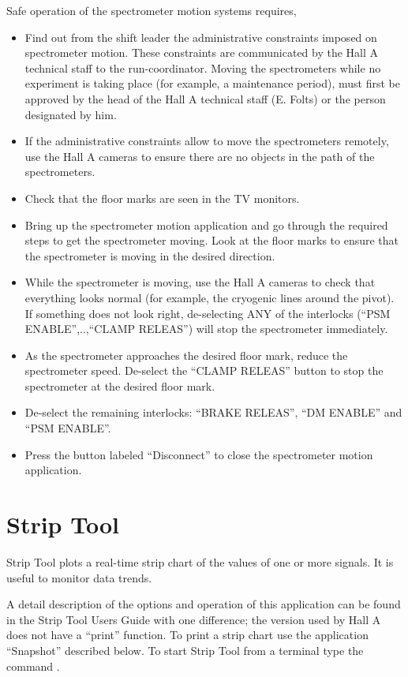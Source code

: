 {\begin{safetyen}{30}{10}
Safe operation of the spectrometer motion systems requires,
\begin{itemize}
\item Find out from the shift leader the administrative constraints imposed on
spectrometer motion.
These constraints are communicated by the Hall A technical staff to the run-coordinator.
Moving the spectrometers while no experiment is taking place (for example,
a maintenance period), must first be approved by the head of the Hall A technical
staff (E. Folts) or the person designated by him.
\item If the administrative constraints allow to move the spectrometers remotely,
use the Hall A cameras
to ensure there are no objects in the path of the spectrometers.
\item Check that the floor marks are seen in the TV monitors.
\item Bring up the spectrometer motion application and go through the required steps
to get the spectrometer moving. Look at the floor marks
to ensure that the spectrometer is moving in the desired direction.
\item While the spectrometer is moving, use
the Hall A cameras to check that everything looks normal (for example, the cryogenic lines
around the pivot). If something does not look right, de-selecting ANY of the
interlocks (``PSM ENABLE'',..,``CLAMP RELEAS'') will stop the spectrometer immediately.
\item As the spectrometer approaches the desired floor mark, reduce the spectrometer
speed. De-select the ``CLAMP RELEAS'' button to stop the spectrometer at the desired floor mark.
\item De-select the remaining interlocks: ``BRAKE RELEAS'', ``DM ENABLE'' and ``PSM ENABLE''.
\item Press the button labeled ``Disconnect'' to close the spectrometer motion
application.
\end{itemize}
\end{safetyen}

\section{Strip Tool}
Strip Tool plots a real-time strip chart of the values of one or more signals.
It is useful to monitor data trends.

A detail description of the options and operation
of this application can be found in the Strip Tool Users
Guide
with one difference; the version used by Hall A does not have a ``print'' function.
To print a strip chart use the application ``Snapshot'' described below.
To start Strip Tool from a terminal type the command .

}
